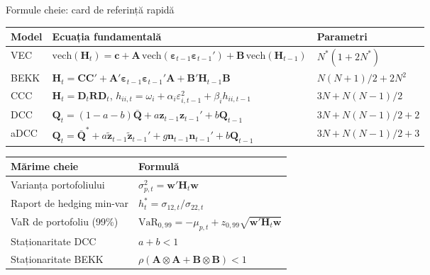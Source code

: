 \documentclass[9pt, aspectratio=169, t]{beamer}
\begin{document}
\begin{frame}{Formule cheie: card de referință rapidă}
    \begin{cminipage}{0.95\textwidth}
    \vspace{-1mm}
    {\scriptsize
    \renewcommand{\arraystretch}{1.3}
    \begin{tabular}{@{}p{1.8cm}p{7.2cm}p{3.5cm}@{}}
        \toprule
        \textbf{Model} & \textbf{Ecuația fundamentală} & \textbf{Parametri} \\
        \midrule
        VEC & $\text{vech}(\mathbf{H}_t) = \mathbf{c} + \mathbf{A}\,\text{vech}(\boldsymbol{\varepsilon}_{t-1}\boldsymbol{\varepsilon}_{t-1}') + \mathbf{B}\,\text{vech}(\mathbf{H}_{t-1})$ & $N^*(1 + 2N^*)$ \\
        BEKK & $\mathbf{H}_t = \mathbf{C}\mathbf{C}' + \mathbf{A}'\boldsymbol{\varepsilon}_{t-1}\boldsymbol{\varepsilon}_{t-1}'\mathbf{A} + \mathbf{B}'\mathbf{H}_{t-1}\mathbf{B}$ & $N(N{+}1)/2 + 2N^2$ \\
        CCC & $\mathbf{H}_t = \mathbf{D}_t\mathbf{R}\mathbf{D}_t$, \quad $h_{ii,t} = \omega_i + \alpha_i\varepsilon_{i,t-1}^2 + \beta_i h_{ii,t-1}$ & $3N + N(N{-}1)/2$ \\
        DCC & $\mathbf{Q}_t = (1{-}a{-}b)\bar{\mathbf{Q}} + a\mathbf{z}_{t-1}\mathbf{z}_{t-1}' + b\mathbf{Q}_{t-1}$ & $3N + N(N{-}1)/2 + 2$ \\
        aDCC & $\mathbf{Q}_t = \bar{\mathbf{Q}}^* + a\tilde{\mathbf{z}}_{t-1}\tilde{\mathbf{z}}_{t-1}' + g\mathbf{n}_{t-1}\mathbf{n}_{t-1}' + b\mathbf{Q}_{t-1}$ & $3N + N(N{-}1)/2 + 3$ \\
        \bottomrule
    \end{tabular}
    \vspace{2mm}

    \begin{tabular}{@{}p{3.5cm}p{9cm}@{}}
        \toprule
        \textbf{Mărime cheie} & \textbf{Formulă} \\
        \midrule
        Varianța portofoliului & $\sigma^2_{p,t} = \mathbf{w}'\mathbf{H}_t\mathbf{w}$ \\
        Raport de hedging min-var & $h_t^* = \sigma_{12,t} / \sigma_{22,t}$ \\
        VaR de portofoliu (99\%) & $\text{VaR}_{0{,}99} = -\mu_{p,t} + z_{0{,}99}\sqrt{\mathbf{w}'\mathbf{H}_t\mathbf{w}}$ \\
        Staționaritate DCC & $a + b < 1$ \\
        Staționaritate BEKK & $\rho(\mathbf{A} \otimes \mathbf{A} + \mathbf{B} \otimes \mathbf{B}) < 1$ \\
        \bottomrule
    \end{tabular}
    }
    \end{cminipage}
\end{frame}
\end{document}
